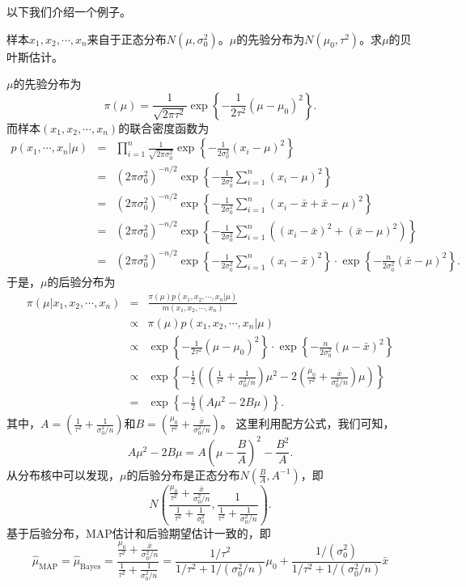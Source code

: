 以下我们介绍一个例子。
\begin{example}
样本$x_1,x_2,\cdots,x_n$来自于正态分布$N(\mu,\sigma_0^2)$。$\mu$的先验分布为$N(\mu_0,\tau^2)$。求$\mu$的贝叶斯估计。
\end{example}
\begin{solution}
    $\mu$的先验分布为
    $$
    \pi(\mu) = \frac{1}{\sqrt{2\pi \tau^2}} \exp\left\{
    - \frac{1}{2\tau^2} (\mu-\mu_0)^2
    \right\}.
    $$
    而样本$(x_1,x_2,\cdots,x_n)$的联合密度函数为
    \begin{eqnarray*}
        p\left(x_{1}, \cdots, x_{n} |\mu\right) &=& \prod_{i=1}^n \frac{1}{\sqrt{2\pi \sigma_0^2}} \exp\left\{-\frac{1}{2\sigma_0^2} (x_i-\mu)^2\right\}\\
        &=& (2\pi \sigma_0^2)^{-n/2} \exp\left\{ -\frac{1}{2\sigma_0^2}\sum_{i=1}^n (x_i-\mu)^2 \right\}\\
        &=&(2\pi \sigma_0^2)^{-n/2} \exp\left\{ -\frac{1}{2\sigma_0^2}\sum_{i=1}^n (x_i -\bar{x} + \bar{x}-\mu)^2 \right\}\\
        &=&(2\pi \sigma_0^2)^{-n/2} \exp\left\{ -\frac{1}{2\sigma_0^2}\sum_{i=1}^n \left((x_i -\bar{x})^2 + (\bar{x}-\mu)^2 \right)\right\}\\
        &=& (2\pi \sigma_0^2)^{-n/2}\exp\left\{ -\frac{1}{2\sigma_0^2}\sum_{i=1}^n (x_i -\bar{x})^2 \right\} \cdot \exp\left\{ -\frac{n}{2\sigma_0^2}(\bar{x}-\mu)^2  \right\}.
    \end{eqnarray*}
    于是，$\mu$的后验分布为
    \begin{eqnarray*}
        \pi(\mu|x_1,x_2,\cdots,x_n) &=& \frac{\pi(\mu) p(x_1,x_2,\cdots,x_n|\mu)}{m(x_1,x_2,\cdots,x_n)}\\
        &\propto&  \pi(\mu) p(x_1,x_2,\cdots,x_n|\mu)\\
        &\propto&  \exp\left\{
    - \frac{1}{2\tau^2} (\mu-\mu_0)^2 
    \right\} \cdot  \exp\left\{ -\frac{n}{2\sigma_0^2}(\mu- \bar{x})^2  \right\}\\
    &\propto& \exp\left\{ -\frac{1}{2} \left( \left( \frac{1}{\tau^2}  + \frac{1}{\sigma_0^2/n}\right) \mu^2  - 2 \left( \frac{\mu_0}{\tau^2}  + \frac{\bar{x}}{\sigma_0^2/n}\right)\mu \right)\right\}\\
    &=& \exp\left\{ -\frac{1}{2} \left( A \mu^2  - 2 B\mu \right)\right\}.
    \end{eqnarray*}
    其中，$A = \left( \frac{1}{\tau^2}  + \frac{1}{\sigma_0^2/n}\right)$和$B = \left( \frac{\mu_0}{\tau^2}  + \frac{\bar{x}}{\sigma_0^2/n}\right)$。
    这里利用配方公式，我们可知，
    $$
    A\mu^2 - 2B\mu = A \left(\mu - \frac{B}{A}\right)^2 - \frac{B^2}{A}.
    $$
    从分布核中可以发现，$\mu$的后验分布是正态分布$N\left(\frac{B}{A},A^{-1}\right)$，即
    $$
    N\left(\frac{\frac{\mu_0}{\tau^2}  + \frac{\bar{x}}{\sigma_0^2/n}}{\frac{1}{\tau^2}  + \frac{1}{\sigma_0^2}}, \frac{1}{\frac{1}{\tau^2}  + \frac{1}{\sigma_0^2/n}}\right).
    $$
    基于后验分布，MAP估计和后验期望估计一致的，即
    $$
    \hat{\mu}_{\text{MAP}} = \hat{\mu}_{\text{Bayes}} = \frac{\frac{\mu_0}{\tau^2}  + \frac{\bar{x}}{\sigma_0^2/n}}{\frac{1}{\tau^2}  + \frac{1}{\sigma_0^2/n}} = \frac{1/\tau^2}{1/\tau^2+1/(\sigma_0^2/n)} \mu_0 + \frac{1/(\sigma_0^2)}{1/\tau^2+1/(\sigma_0^2/n)} \bar{x}
    $$
\end{solution}
